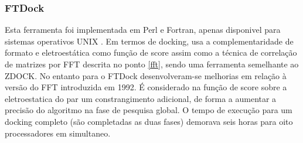 \subsubsection{FTDock}
Esta ferramenta foi implementada em Perl e Fortran, apenas disponivel para sistemas operativos UNIX \cite{ftdock}.
Em termos de docking, usa a complementaridade de formato e eletroestática como função de score assim como a técnica de correlação de matrizes por FFT descrita no ponto \ref{fft}, sendo uma ferramenta semelhante ao ZDOCK. No entanto para o FTDock desenvolveram-se melhorias em relação à versão do FFT introduzida em 1992. É considerado na função de score sobre a eletroestatica do par um constrangimento adicional, de forma a aumentar a precisão do algoritmo na fase de pesquisa global.
O tempo de execução para um docking completo (são completadas as duas fases) demorava seis horas para oito processadores em simultaneo. 
